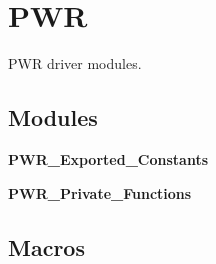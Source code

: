 \section{P\+WR}
\label{group__PWR}


P\+WR driver modules.  


\subsection*{Modules}
\begin{DoxyCompactItemize}
\item 
\textbf{ P\+W\+R\+\_\+\+Exported\+\_\+\+Constants}
\item 
\textbf{ P\+W\+R\+\_\+\+Private\+\_\+\+Functions}
\end{DoxyCompactItemize}
\subsection*{Macros}
